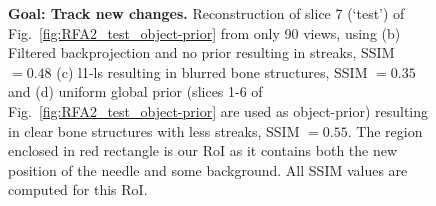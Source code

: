 \documentclass[journal]{IEEEtran}
\begin{document}
\begin{figure}[!h]
\caption[Representative results-1]{\textbf{Goal: Track new changes.}\small{ Reconstruction of slice 7 (`test') of Fig.~\ref{fig:RFA2_test_object-prior} from only 90 views, using (b) Filtered backprojection and no prior resulting in streaks, SSIM $= 0.48$ (c) l1-ls resulting in blurred bone structures, SSIM $=0.35$ and (d) uniform global prior (slices 1-6 of Fig.~\ref{fig:RFA2_test_object-prior} are used as object-prior) resulting in clear bone structures with less streaks, SSIM $=0.55$. The region enclosed in red rectangle is our RoI as it contains both the new position of the needle and some background. All SSIM values are computed for this RoI.}}
\label{fig:RFA2_very_few_views}
\end{figure}


\begin{figure}[!h]
\centering
{}\hfill
{}\hfill
{}\hfill
{}

\end{figure}
\end{document}
